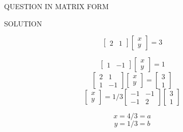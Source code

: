 \documentclass[10pt]{beamer}
\begin{document}
{\begin{frame}{QUESTION IN MATRIX FORM}
 
\end{frame}
\begin{frame}{SOLUTION}

 
    \[
\begin{bmatrix}
2 & 1
\end{bmatrix}
\begin{bmatrix}
x\\
y
\end{bmatrix}
=3

\]

 \[
\begin{bmatrix}
1 & -1
\end{bmatrix}
\begin{bmatrix}
x\\
y
\end{bmatrix}
=1

\]
 \[
\begin{bmatrix}
2 & 1\\
1 & -1
\end{bmatrix}
\begin{bmatrix}
x\\
y
\end{bmatrix}
=
\begin{bmatrix}
3\\
1
\end{bmatrix}

\]
 \[
\begin{bmatrix}
x\\
y
\end{bmatrix}
=1/3
\begin{bmatrix}
-1 & -1\\
-1 & 2

\end{bmatrix}
\begin{bmatrix}
3\\
1
\end{bmatrix}

\]

\begin{equation}
x=4/3=a 
\end{equation}
\begin{equation}
y=1/3=b 
\end{equation}


\end{frame}}
\end{document}
